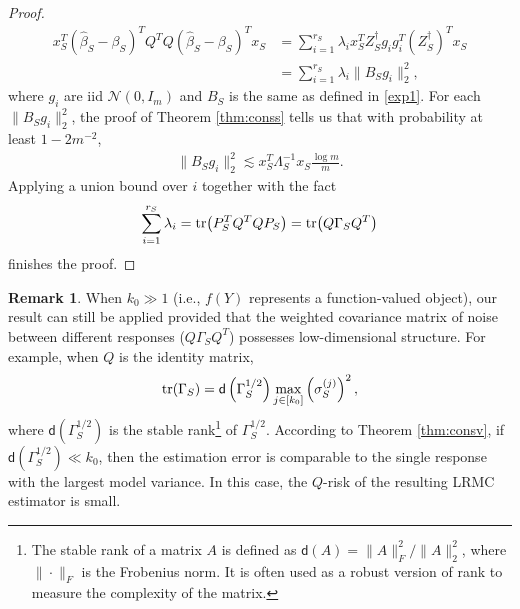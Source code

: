 \documentclass[a4paper,11pt]{article}
\numberwithin{equation}{section}
\theoremstyle{plain}
\theoremstyle{definition}
\newtheorem{Rem}[Th]{Remark}
\def\dd{{\mathsf{d}}}
\begin{document}
\begin{proof}
\begin{align}
x_S^T(\widehat{\beta}_S-\beta_S)^TQ^TQ(\widehat{\beta}_S-\beta_S)^Tx_S &= \sum_{i=1}^{r_S}\lambda_ix_S^TZ_S^\dagger g_ig_i^T(Z_S^\dagger)^Tx_S\nonumber\\
& = \sum_{i = 1}^{r_S}\lambda_i\|B_Sg_i\|_2^2,\label{hap}
\end{align}
where $g_i$ are iid $\mathcal N(0, I_m)$ and $B_S$ is the same as defined in \eqref{exp1}. 
For each $\|B_Sg_i\|_2^2$, the proof of Theorem \ref{thm:conss} tells us that with probability at least $1-2m^{-2}$, 
\begin{align*}
\|B_Sg_i\|_2^2\lesssim x_S^T\Lambda_S^{-1}x_S\frac{\log m}{m}.
\end{align*}  
Applying a union bound over $i$ together with the fact $$\sum_{i=1}^{r_S}\lambda_i = \tr(P_S^TQ^TQP_S) = \tr(Q\Gamma_SQ^T)$$ finishes the proof. 
\end{proof}

\begin{Rem}
When $k_0\gg 1$ (i.e., $f(Y)$ represents a function-valued object), our result can still be applied provided that the weighted covariance matrix of noise between different responses ($Q\Gamma_S Q^T$) possesses low-dimensional structure. 
For example, when $Q$ is the identity matrix, 
\begin{align*}
\tr(\Gamma_S) = \dd\left(\Gamma_S^{1/2}\right)\max_{j\in [k_0]}\left(\sigma^{(j)}_S\right)^2,
\end{align*} 
where $\dd(\Gamma_S^{1/2})$ is the stable rank\footnote{The stable rank of a matrix $A$ is defined as $\dd(A) = \|A\|_F^2/\|A\|_2^2$, where $\|\cdot\|_F$ is the Frobenius norm. It is often used as a robust version of rank to measure the complexity of the matrix.} of $\Gamma_S^{1/2}$. 
According to Theorem \ref{thm:consv}, if $\dd(\Gamma_S^{1/2})\ll k_0$, then the estimation error is comparable to the single response with the largest model variance.
In this case, the $Q$-risk of the resulting LRMC estimator is small.  
\end{Rem}
\end{document}
